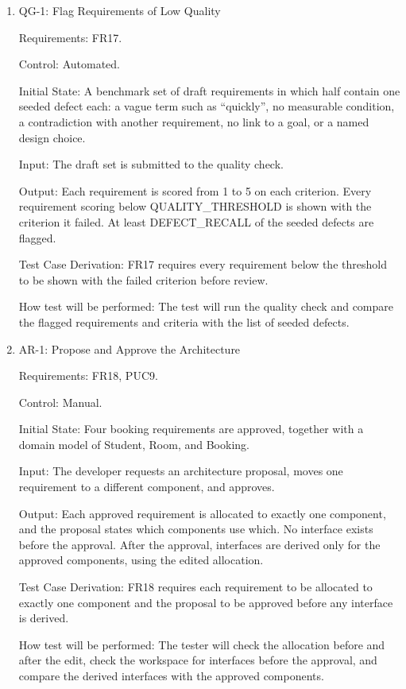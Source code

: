 \documentclass[12pt, titlepage]{article}
\begin{document}
\begin{enumerate}

\item{QG-1: Flag Requirements of Low Quality\\}

Requirements: FR17.

Control: Automated.

Initial State: A benchmark set of draft requirements in which half contain one
seeded defect each: a vague term such as ``quickly'', no measurable
condition, a contradiction with another requirement, no link to a goal, or a
named design choice.

Input: The draft set is submitted to the quality check.

Output: Each requirement is scored from 1 to 5 on each criterion. Every
requirement scoring below QUALITY\_THRESHOLD is shown with the criterion it
failed. At least DEFECT\_RECALL of the seeded defects are flagged.

Test Case Derivation: FR17 requires every requirement below the threshold to
be shown with the failed criterion before review.

How test will be performed: The test will run the quality check and compare
the flagged requirements and criteria with the list of seeded defects.

\item{AR-1: Propose and Approve the Architecture\\}

Requirements: FR18, PUC9.

Control: Manual.

Initial State: Four booking requirements are approved, together with a
domain model of Student, Room, and Booking.

Input: The developer requests an architecture proposal, moves one requirement
to a different component, and approves.

Output: Each approved requirement is allocated to exactly one component, and
the proposal states which components use which. No interface exists before
the approval. After the approval, interfaces are derived only for the
approved components, using the edited allocation.

Test Case Derivation: FR18 requires each requirement to be allocated to
exactly one component and the proposal to be approved before any interface is
derived.

How test will be performed: The tester will check the allocation before and
after the edit, check the workspace for interfaces before the approval, and
compare the derived interfaces with the approved components.

\end{enumerate}
\end{document}
